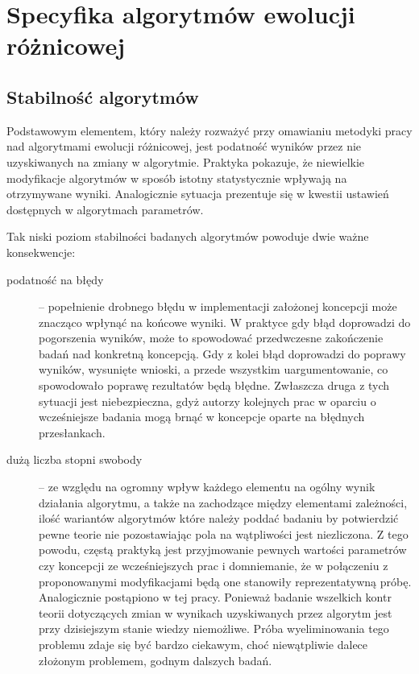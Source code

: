 \documentclass[12pt,a4paper]{report}
\begin{document}
{{{{{{{\section{Specyfika algorytmów ewolucji różnicowej}
\subsection{Stabilność algorytmów}
\par{
Podstawowym elementem, który należy rozważyć przy omawianiu metodyki pracy nad algorytmami ewolucji różnicowej, jest podatność wyników przez nie uzyskiwanych na zmiany w algorytmie. Praktyka pokazuje, że niewielkie modyfikacje algorytmów w sposób istotny statystycznie wpływają na otrzymywane wyniki. Analogicznie sytuacja prezentuje się w kwestii ustawień dostępnych w algorytmach parametrów.
}
\par{
Tak niski poziom stabilności badanych algorytmów powoduje dwie ważne konsekwencje:
\begin{description}
\item[podatność na błędy] -- popełnienie drobnego błędu w implementacji założonej koncepcji może znacząco wpłynąć na końcowe wyniki. W praktyce gdy błąd doprowadzi do pogorszenia wyników, może to spowodować przedwczesne zakończenie badań nad konkretną koncepcją. Gdy z kolei błąd doprowadzi do poprawy wyników, wysunięte wnioski, a przede wszystkim uargumentowanie, co spowodowało poprawę rezultatów będą błędne. Zwłaszcza druga z tych sytuacji jest niebezpieczna, gdyż autorzy kolejnych prac w oparciu o wcześniejsze badania mogą brnąć w koncepcje oparte na błędnych przesłankach.
\item[dużą liczba stopni swobody] -- ze względu na ogromny wpływ każdego elementu na ogólny wynik działania algorytmu, a także na zachodzące między elementami zależności, ilość wariantów algorytmów które należy poddać badaniu by potwierdzić pewne teorie nie pozostawiając pola na wątpliwości jest niezliczona. Z tego powodu, częstą praktyką jest przyjmowanie pewnych wartości parametrów czy koncepcji ze wcześniejszych prac i domniemanie, że w połączeniu z proponowanymi modyfikacjami będą one stanowiły reprezentatywną próbę. Analogicznie postąpiono w tej pracy. Ponieważ badanie wszelkich kontr teorii dotyczących zmian w wynikach uzyskiwanych przez algorytm jest przy dzisiejszym stanie wiedzy niemożliwe. Próba wyeliminowania tego problemu zdaje się być bardzo ciekawym, choć niewątpliwie dalece złożonym problemem, godnym dalszych badań.
\end{description}
}
}}}}}}}
\end{document}
